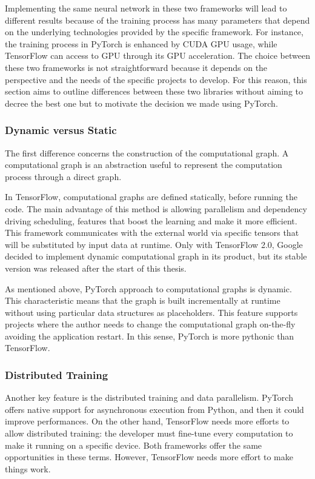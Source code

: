 Implementing the same neural network in these two frameworks will lead to different results because of the training process has many parameters that depend on the underlying technologies provided by the specific framework.
For instance, the training process in PyTorch is enhanced by CUDA GPU usage, while TensorFlow can access to GPU through its GPU acceleration.
The choice between these two frameworks is not straightforward because it depends on the perspective and the needs of the specific projects to develop.
For this reason, this section aims to outline differences between these two libraries without aiming to decree the best one but to motivate the decision we made using PyTorch.

\subsubsection{Dynamic versus Static}

The first difference concerns the construction of the computational graph.
A computational graph is an abstraction useful to represent the computation process through a direct graph.

In TensorFlow, computational graphs are defined statically, before running the code.
The main advantage of this method is allowing parallelism and dependency driving scheduling, features that boost the learning and make it more efficient.
This framework communicates with the external world via specific tensors that will be substituted by input data at runtime.
Only with TensorFlow 2.0, Google decided to implement dynamic computational graph in its product, but its stable version was released after the start of this thesis.

As mentioned above, PyTorch approach to computational graphs is dynamic.
This characteristic means that the graph is built incrementally at runtime without using particular data structures as placeholders.
This feature supports projects where the author needs to change the computational graph on-the-fly avoiding the application restart.
In this sense, PyTorch is more pythonic than TensorFlow.

\subsubsection{Distributed Training}

Another key feature is the distributed training and data parallelism.
PyTorch offers native support for asynchronous execution from Python, and then it could improve performances.
On the other hand, TensorFlow needs more efforts to allow distributed training: the developer must fine-tune every computation to make it running on a specific device.
Both frameworks offer the same opportunities in these terms.
However, TensorFlow needs more effort to make things work.


